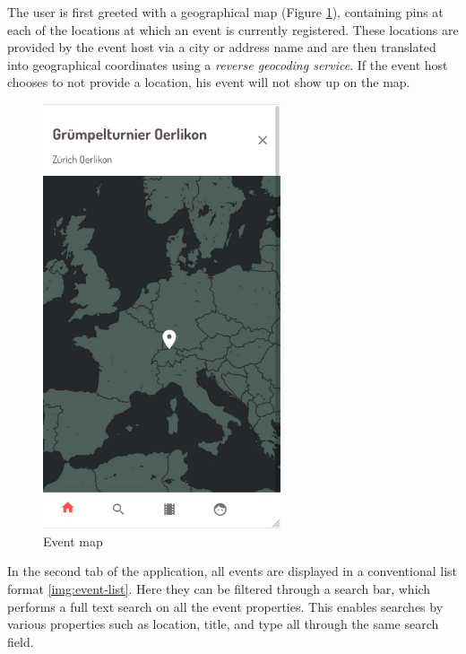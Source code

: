 The user is first greeted with a geographical map (Figure \ref{img:event-map}), containing pins at each of the locations at which an event is currently registered. These locations are provided by the event host via a city or address name and are then translated into geographical coordinates using a \textit{reverse geocoding service}. If the event host chooses to not provide a location, his event will not show up on the map. 
\begin{figure}[H]
    \centering
    \includegraphics[width=7cm]{images/map.png}
    \caption{Event map}
    \label{img:event-map}
\end{figure}
In the second tab of the application, all events are displayed in a conventional list format \ref{img:event-list}. Here they can be filtered through a search bar, which performs a full text search on all the event properties. This enables searches by various properties such as location, title, and type all through the same search field.

